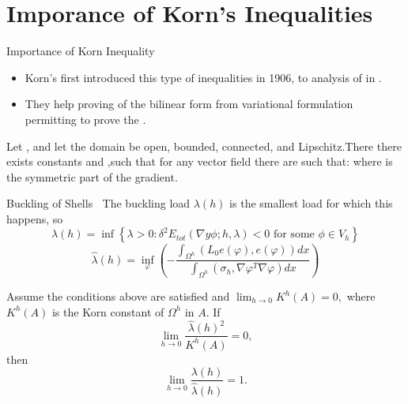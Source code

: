 \documentclass{beamer}
\newcommand{\bul}{{\color{structure}\textbullet}}
\begin{document}
    \section{Imporance of Korn's Inequalities}
    \begin{frame}{Importance of Korn Inequality}
        \begin{itemize}
            \item[\bul]  Korn's first introduced this type of inequalities in 1906, to analysis of  in . 
            \vfill\pause
            \item[\bul]  They help proving  of the bilinear form from variational formulation permitting to prove the .
        \end{itemize}
        \vfill\pause

        \begin{theorem} 
            Let , and let the domain  be open, bounded, connected, and Lipschitz.There there exists constants  and ,such that for any vector field  there are  such that:
           where  is the symmetric part of the gradient. 
       \end{theorem}
    \end{frame}
    \begin{frame}{Buckling of Shells}
        \bul$\ $  The buckling load {\color{violet}$\lambda(h)$} is the smallest load for which this happens, so
{\color{violet}$$
\lambda(h)=\inf \left\{\lambda>0: \delta^{2} E_{tot}(\nabla y\phi ; h, \lambda)<0 \text { for some } \phi \in V_{h}\right\}
$$}\pause
{\color{violet}
$$
\hat{\lambda}(h)
=\inf_{\varphi} \left(-\frac{\int_{\Omega^h}(L_0e(\varphi),e(\varphi))dx}{\int_{\Omega^h}(\sigma_h,\nabla\varphi^T\nabla\varphi) dx}\right) 
$$}
\pause
        \begin{theorem} Assume the conditions above are satisfied and 
            {\color{violet} $ \lim_{h\to 0} K^h(A)=0,$} where {\color{violet}$K^h(A)$} is the Korn constant of {\color{violet}$\Omega^h$} in {\color{violet}$A.$} If 
            {\color{violet} 
            $$
            \lim_{h\to 0} \frac{\hat{\lambda}(h)^2}{K^h(A)}=0,
            $$
            }
            then 
            {\color{violet} 
            $$
            \lim_{h\to 0} \frac{\lambda(h)}{\hat{\lambda}(h)}=1.
            $$
            }
        \end{theorem}
    \end{frame}
\end{document}
